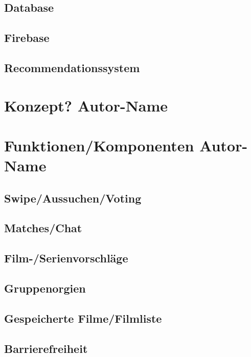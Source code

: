 \documentclass[11pt,a4paper]{article}
\begin{document}
\subsection{Database}
%

\subsection{Firebase}
%

\subsection{Recommendationssystem}
%	
		

\section[Konzept]{Konzept? \hfill \normalfont \small{Autor-Name}}
\section[Funktionen/Komponenten]{Funktionen/Komponenten \hfill \normalfont \small{Autor-Name}}

\subsection{Swipe/Aussuchen/Voting}		

\subsection{Matches/Chat}		

\subsection{Film-/Serienvorschläge}		

\subsection{Gruppenorgien}		

\subsection{Gespeicherte Filme/Filmliste}		

\subsection{Barrierefreiheit}
\label{sec:barrierefreiheit}

\end{document}
